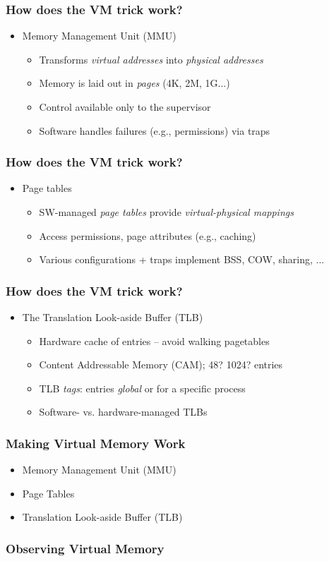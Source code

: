 \documentclass[pdftex]{beamer} %
\begin{document}
\begin{frame}
  \frametitle{How does the VM trick work?}

  \begin{itemize}

    \item Memory Management Unit (MMU)
    \begin{itemize}
      \item Transforms \textit{virtual addresses} into \textit{physical addresses}
      \item Memory is laid out in \textit{pages} (4K, 2M, 1G...)
      \item Control available only to the supervisor
      \item Software handles failures (e.g., permissions) via traps
    \end{itemize}
  \end{itemize}
\end{frame}

\begin{frame}
  \frametitle{How does the VM trick work?}

  \begin{itemize}

    \item Page tables
    \begin{itemize}
      \item SW-managed \textit{page tables} provide \textit{virtual-physical
	mappings}
      \item Access permissions, page attributes (e.g., caching)
      \item Various configurations + traps implement BSS, COW, sharing, ...
    \end{itemize}

  \end{itemize}
\end{frame}

\begin{frame}
  \frametitle{How does the VM trick work?}

  \begin{itemize}
    \item The Translation Look-aside Buffer (TLB)
    \begin{itemize}
      \item Hardware cache of entries -- avoid walking pagetables
      \item Content Addressable Memory (CAM); 48? 1024? entries
      \item TLB \textit{tags}: entries \textit{global} or for a specific process
      \item Software- vs. hardware-managed TLBs
    \end{itemize}

  \end{itemize}
\end{frame}

\begin{frame}
  \frametitle{Making Virtual Memory Work}
  \begin{itemize}
  \item Memory Management Unit (MMU)
  \item Page Tables
  \item Translation Look-aside Buffer (TLB)
  \end{itemize}
\end{frame}

\begin{frame}
  \frametitle{Observing Virtual Memory}
  
\end{frame}
\end{document}
